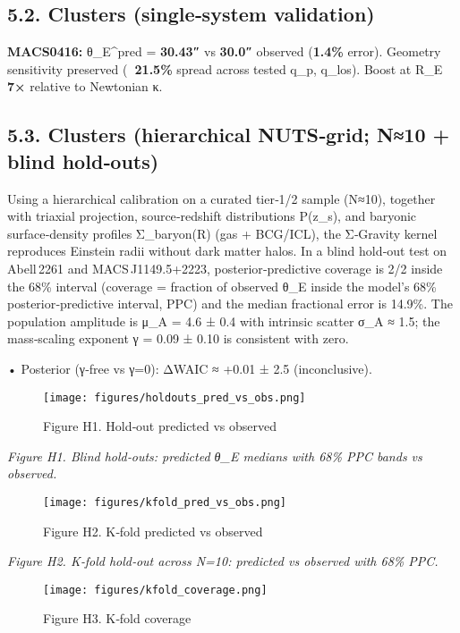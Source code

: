 \documentclass[11pt,a4paper]{article}
\begin{document}
\subsection{5.2. Clusters (single‑system validation)}


\textbf{MACS0416:} θ\_E^pred = \textbf{30.43″} vs \textbf{30.0″} observed (\textbf{1.4\%} error). Geometry sensitivity preserved (\textbf{~21.5\%} spread across tested {q\_p, q\_los}). Boost at R\_E \textbf{~ 7×} relative to Newtonian κ.


\subsection{5.3. Clusters (hierarchical NUTS‑grid; N≈10 + blind hold‑outs)}


Using a hierarchical calibration on a curated tier‑1/2 sample (N≈10), together with triaxial projection, source‑redshift distributions P(z\_s), and baryonic surface‑density profiles Σ\_baryon(R) (gas + BCG/ICL), the Σ‑Gravity kernel reproduces Einstein radii without dark matter halos. In a blind hold‑out test on Abell 2261 and MACS J1149.5+2223, posterior‑predictive coverage is 2/2 inside the 68\% interval (coverage = fraction of observed θ\_E inside the model’s 68\% posterior‑predictive interval, PPC) and the median fractional error is 14.9\%. The population amplitude is μ\_A = 4.6 ± 0.4 with intrinsic scatter σ\_A ≈ 1.5; the mass‑scaling exponent γ = 0.09 ± 0.10 is consistent with zero.  

• Posterior (γ‑free vs γ=0): ΔWAIC ≈ +0.01 ± 2.5 (inconclusive).  


\begin{figure}[h]
\centering
\texttt{[image: figures/holdouts\_pred\_vs\_obs.png]}
\caption{Figure H1. Hold‑out predicted vs observed}
\end{figure}


\textit{Figure H1. Blind hold‑outs: predicted θ\_E medians with 68\% PPC bands vs observed.}


\begin{figure}[h]
\centering
\texttt{[image: figures/kfold\_pred\_vs\_obs.png]}
\caption{Figure H2. K‑fold predicted vs observed}
\end{figure}


\textit{Figure H2. K‑fold hold‑out across N=10: predicted vs observed with 68\% PPC.}


\begin{figure}[h]
\centering
\texttt{[image: figures/kfold\_coverage.png]}
\caption{Figure H3. K‑fold coverage}
\end{figure}
\end{document}
